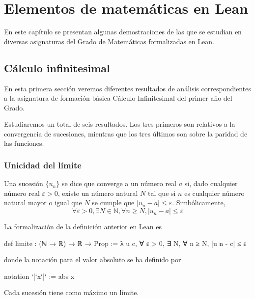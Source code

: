 \chapter{Elementos de matemáticas en Lean}

En este capítulo se presentan algunas demostraciones de las que se
estudian en diversas asignaturas del Grado de Matemáticas formalizadas
en Lean.

\section{Cálculo infinitesimal}

En esta primera sección veremos diferentes resultados de análisis
correspondientes a la asignatura de formación básica Cálculo
Infinitesimal del primer año del Grado.


Estudiaremos un total de seis resultados. Los tres primeros son relativos
a la convergencia de sucesiones, mientras que los tres últimos son sobre
la paridad de las funciones.

\subsection{Unicidad del límite}

\begin{definicion}\label{limite}
  Una sucesión \(\{u_n\}\) se dice que converge a un número real \(a\) si,
  dado cualquier número real \(ε > 0\), existe un número natural \(N\)
  tal que si \(n\) es cualquier número natural mayor o igual que \(N\) se
  cumple que \(|u_n-a| ≤ ε\). Simbólicamente,
  \[∀ ε > 0, ∃ N ∈ ℕ, ∀ n ≥ N, |u_n-a| ≤ ε\]
\end{definicion}

La formalización de la definición anterior en Lean es
\begin{leancode}
def limite : (ℕ → ℝ) → ℝ → Prop :=
λ u c, ∀ ε > 0, ∃ N, ∀ n ≥ N, |u n - c| ≤ ε
\end{leancode}
donde la notación para el valor absoluto se ha definido por
\begin{leancode}
notation `|`x`|` := abs x
\end{leancode}

\begin{teorema}
Cada sucesión tiene como máximo un límite.
\end{teorema}

